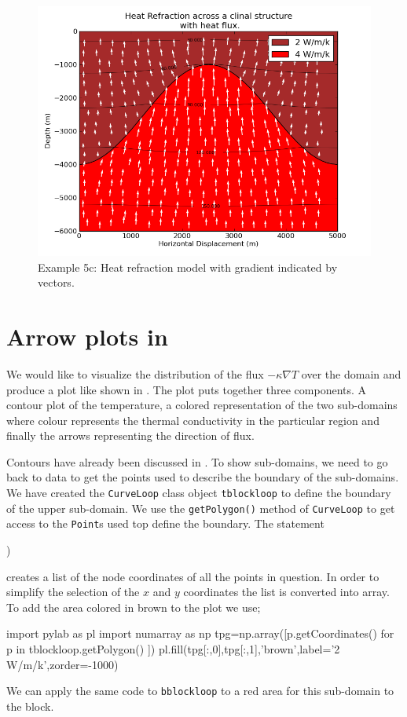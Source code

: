 \begin{figure}[ht]
\centerline{\includegraphics[width=5.in]{figures/heatrefractionflux}}
\caption{Example 5c: Heat refraction model with gradient indicated by vectors.}
\label{fig:hr001qumodel}
\end{figure}

\section{Arrow plots in \mpl}
We would like to visualize the distribution of the flux $-\kappa \nabla T$ over the domain 
and produce a plot like shown in . 
The plot puts together three components. A contour plot of the temperature,
a colored representation of the two sub-domains where colour represents the thermal conductivity 
in the particular region and finally the arrows representing the direction of flux.

Contours have already been discussed in . To show sub-domains, 
we need to go back to \pycad data to get the points used to describe the boundary of the 
sub-domains. We have created the \verb|CurveLoop| class object 
\verb|tblockloop| to define the boundary of the upper sub-domain. 
We use the \verb|getPolygon()| method of \verb|CurveLoop| to get
access to the \verb|Point|s used top define the boundary. The statement
\begin{python}
)
\end{python}
creates a list of the node coordinates of all the points in question. In order 
to simplify the selection of the $x$ and $y$ coordinates the list is converted 
into \modnumpy array. To add the area colored in brown to the plot we use; 
\begin{python}
import pylab as pl
import numarray as np
tpg=np.array([p.getCoordinates() for p in tblockloop.getPolygon() ])
pl.fill(tpg[:,0],tpg[:,1],'brown',label='2 W/m/k',zorder=-1000)
\end{python}
We can apply the same code to \verb|bblockloop| to a red area for this sub-domain to the block.

